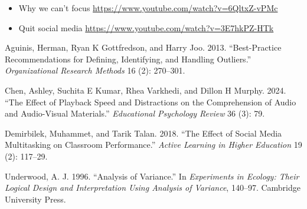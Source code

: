 \documentclass[
  letterpaper,
]{book}
\newlength{\cslhangindent}
\newenvironment{CSLReferences}[2] %
 {\begin{list}{}{%
  \setlength{\itemindent}{0pt}
  \setlength{\leftmargin}{0pt}
  \setlength{\parsep}{0pt}
  \ifodd #1
   \setlength{\leftmargin}{\cslhangindent}
   \setlength{\itemindent}{-1\cslhangindent}
  \fi
  \setlength{\itemsep}{#2\baselineskip}}}
 {\end{list}}
\begin{document}
\begin{itemize}
\item
  Why we can't focus \url{https://www.youtube.com/watch?v=6QltxZ-vPMc}
\item
  Quit social media \url{https://www.youtube.com/watch?v=3E7hkPZ-HTk}
\end{itemize}

\label{refs}
\begin{CSLReferences}{1}{0}
Aguinis, Herman, Ryan K Gottfredson, and Harry Joo. 2013.
{``Best-Practice Recommendations for Defining, Identifying, and Handling
Outliers.''} \emph{Organizational Research Methods} 16 (2): 270--301.

Chen, Ashley, Suchita E Kumar, Rhea Varkhedi, and Dillon H Murphy. 2024.
{``The Effect of Playback Speed and Distractions on the Comprehension of
Audio and Audio-Visual Materials.''} \emph{Educational Psychology
Review} 36 (3): 79.

Demirbilek, Muhammet, and Tarik Talan. 2018. {``The Effect of Social
Media Multitasking on Classroom Performance.''} \emph{Active Learning in
Higher Education} 19 (2): 117--29.

Underwood, A. J. 1996. {``Analysis of Variance.''} In \emph{Experiments
in Ecology: Their Logical Design and Interpretation Using Analysis of
Variance}, 140--97. Cambridge University Press.

\end{CSLReferences}


\backmatter
\end{document}
